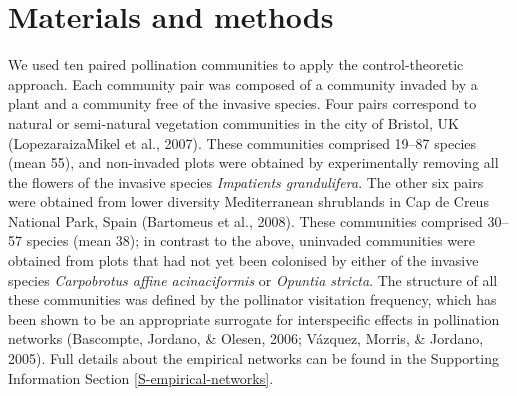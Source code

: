 \documentclass[a4paper]{artikel1}
\theoremstyle{definition}
\theoremstyle{definition}
\theoremstyle{definition}
\theoremstyle{remark}
\begin{document}
\section{Materials and methods}\label{materials-and-methods}

We used ten paired pollination communities to apply the
control-theoretic approach. Each community pair was composed of a
community invaded by a plant and a community free of the invasive
species. Four pairs correspond to natural or semi-natural vegetation
communities in the city of Bristol, UK (Lopezaraiza\textendash{}Mikel et
al., 2007). These communities comprised 19--87 species (mean 55), and
non-invaded plots were obtained by experimentally removing all the
flowers of the invasive species \emph{Impatients grandulifera}. The
other six pairs were obtained from lower diversity Mediterranean
shrublands in Cap de Creus National Park, Spain (Bartomeus et al.,
2008). These communities comprised 30--57 species (mean 38); in contrast
to the above, uninvaded communities were obtained from plots that had
not yet been colonised by either of the invasive species
\emph{Carpobrotus affine acinaciformis} or \emph{Opuntia stricta}. The
structure of all these communities was defined by the pollinator
visitation frequency, which has been shown to be an appropriate
surrogate for interspecific effects in pollination networks (Bascompte,
Jordano, \& Olesen, 2006; Vázquez, Morris, \& Jordano, 2005). Full
details about the empirical networks can be found in the Supporting
Information Section \ref{S-empirical-networks}.
\end{document}
